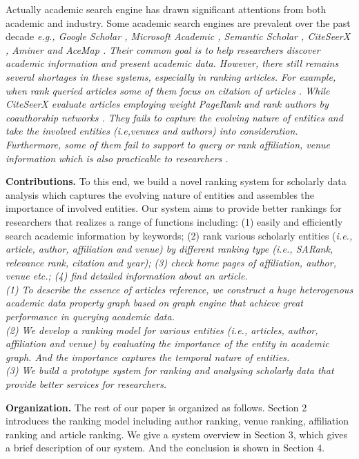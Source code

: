 
\par
Actually academic search engine has drawn significant attentions from both academic and industry. Some academic search engines are prevalent over the past decade \itshape e.g., \upshape Google Scholar \cite{googlescholar}, Microsoft Academic \cite{sinha2015overview}, Semantic Scholar \cite{semantic}, CiteSeerX \cite{li2006citeseerx}, Aminer \cite{tang2008arnetminer} and AceMap \cite{tan2016acemap}. Their common goal is to help researchers discover academic information and present academic data. However, there still remains several shortages in these systems, especially in ranking articles. For example, when rank queried articles some of them focus on citation of articles \cite{tang2008arnetminer,tan2016acemap}. While CiteSeerX evaluate articles employing weight PageRank and rank authors by coauthorship networks \cite{sun2007popularity,fiala2013citeseer}. They fails to capture the evolving nature of entities and take the involved entities (\itshape i.e,\upshape venues and authors) into consideration. Furthermore, some of them fail to support to query or rank affiliation, venue information which is also practicable to researchers \cite{tan2016acemap, googlescholar}.

\par
\textbf{Contributions.}
To this end, we build a novel ranking system for scholarly data analysis which captures the evolving nature of entities and assembles the importance of involved entities. Our system aims to provide better rankings for researchers that realizes a range of functions including: (1) easily and efficiently search academic information by keywords; (2) rank various scholarly entities (\itshape i.e., \upshape article, author, affiliation and venue) by different ranking type (\itshape i.e., \upshape SARank, relevance rank, citation and year); (3) check home pages of affiliation, author, venue  \itshape etc.\upshape ; (4) find detailed information about an article.
\\(1) To describe the essence of articles reference, we construct a huge heterogenous academic data property graph based on graph engine that achieve great performance in querying academic data.
\\(2) We develop a ranking model for various entities (\itshape i.e., \upshape articles, author, affiliation and venue) by evaluating the importance of the entity in academic graph. And the importance captures the temporal nature of entities.
\\(3) We build a prototype system for ranking and analysing scholarly data that provide better services for researchers.

\par
\textbf{Organization.}
The rest of our paper is organized as follows. Section 2 introduces the ranking model including author ranking, venue ranking, affiliation ranking and article ranking. We give a system overview in Section 3, which gives a brief description of our system. And the conclusion is shown in Section 4.
